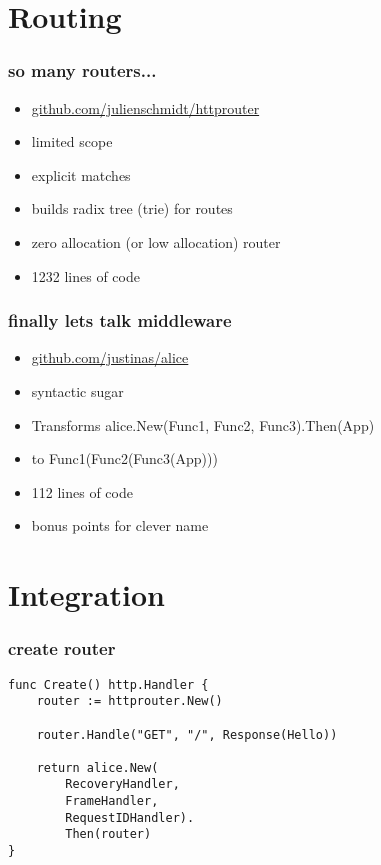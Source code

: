 \documentclass{beamer}
\begin{document}
\section{Routing}

\begin{frame}[fragile]
\frametitle{so many routers...}
\begin{itemize}
\item \href{https://github.com/julienschmidt/httprouter}{github.com/julienschmidt/httprouter}
\item limited scope
\item explicit matches
\item builds radix tree (trie) for routes
\item zero allocation (or low allocation) router
\item 1232 lines of code
\end{itemize}
\end{frame}

\begin{frame}[fragile]
\frametitle{finally lets talk middleware}
\begin{itemize}
\item \href{https://github.com/justinas/alice}{github.com/justinas/alice}
\item syntactic sugar
\item Transforms alice.New(Func1, Func2, Func3).Then(App)
\item to Func1(Func2(Func3(App)))
\item 112 lines of code
\item bonus points for clever name
\end{itemize}
\end{frame}

\section{Integration}

\begin{frame}[fragile]
\frametitle{create router}
\begin{lstlisting}[basicstyle=\ttfamily\footnotesize]
func Create() http.Handler {
	router := httprouter.New()

	router.Handle("GET", "/", Response(Hello))

	return alice.New(
		RecoveryHandler,
		FrameHandler,
		RequestIDHandler).
		Then(router)
}
\end{lstlisting}
\end{frame}
\end{document}
